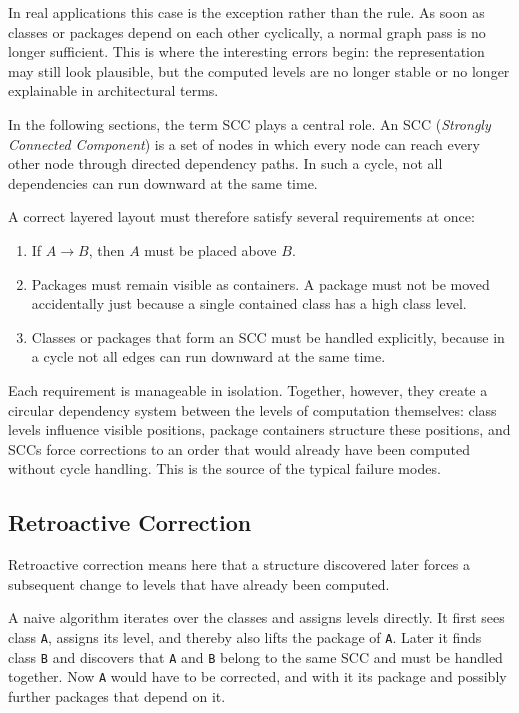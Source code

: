 \documentclass[a4paper,11pt]{article}
\begin{document}
In real applications this case is the exception rather than the rule. As soon
as classes or packages depend on each other cyclically, a normal graph pass is
no longer sufficient. This is where the interesting errors begin: the
representation may still look plausible, but the computed levels are no longer
stable or no longer explainable in architectural terms.

In the following sections, the term SCC plays a central role. An SCC
(\emph{Strongly Connected Component}) is a set of nodes in which every node can
reach every other node through directed dependency paths. In such a cycle, not
all dependencies can run downward at the same time.

A correct layered layout must therefore satisfy several requirements at once:

\begin{enumerate}
  \item If $A \to B$, then $A$ must be placed above $B$.
  \item Packages must remain visible as containers. A package must not be moved
        accidentally just because a single contained class has a high class
        level.
  \item Classes or packages that form an SCC must be handled explicitly,
        because in a cycle not all edges can run downward at the same time.
\end{enumerate}

Each requirement is manageable in isolation. Together, however, they create a
circular dependency system between the levels of computation themselves: class
levels influence visible positions, package containers structure these
positions, and SCCs force corrections to an order that would already have been
computed without cycle handling. This is the source of the typical failure
modes.

\subsection{Retroactive Correction}

Retroactive correction means here that a structure discovered later forces a
subsequent change to levels that have already been computed.

A naive algorithm iterates over the classes and assigns levels directly. It
first sees class \texttt{A}, assigns its level, and thereby also lifts the
package of \texttt{A}. Later it finds class \texttt{B} and discovers that
\texttt{A} and \texttt{B} belong to the same SCC and must be handled together.
Now \texttt{A} would have to be corrected, and with it its package and possibly
further packages that depend on it.
\end{document}
